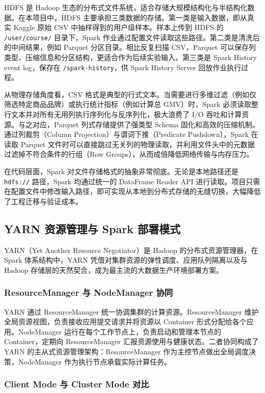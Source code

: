 HDFS 是 Hadoop 生态的分布式文件系统，适合存储大规模结构化与半结构化数据。在本项目中，HDFS 主要承担三类数据的存储。第一类是输入数据，即从真实 Kaggle 原始 CSV 中抽样得到的用户级样本。样本上传到 HDFS 的 \texttt{/user/course/} 目录下，Spark 作业通过配置文件读取这些路径。第二类是清洗后的中间结果，例如 Parquet 分区目录。相比反复扫描 CSV，Parquet 可以保存列类型、压缩信息和分区结构，更适合作为后续实验输入。第三类是 Spark History event log，保存在 \texttt{/spark-history}，供 Spark History Server 回放作业执行过程。

从物理存储角度看，CSV 格式是典型的行式文本。当需要进行多维过滤（例如仅筛选特定商品品牌）或执行统计指标（例如计算总 GMV）时，Spark 必须读取整行文本并对所有无用列执行序列化与反序列化，极大浪费了 I/O 吞吐和计算资源。与之对应，Parquet 列式存储提供了强类型 Schema 固化和高效的压缩机制。通过列裁剪（Column Projection）与谓词下推（Predicate Pushdown），Spark 在读取 Parquet 文件时可以直接跳过无关列的物理读取，并利用文件头中的元数据过滤掉不符合条件的行组（Row Groups），从而成倍降低网络传输与内存压力。

在代码层面，Spark 对文件存储格式的抽象非常彻底。无论是本地路径还是 \texttt{hdfs://} 路径，Spark 均通过统一的 DataFrame Reader API 进行读取。项目只需在配置文件中修改输入路径，即可实现从本地到分布式存储的无缝切换，大幅降低了工程迁移与验证成本。

\subsection{YARN 资源管理与 Spark 部署模式}

YARN（Yet Another Resource Negotiator）是 Hadoop 的分布式资源管理器，在 Spark 体系结构中，YARN 凭借对集群资源的弹性调度、应用队列隔离以及与 Hadoop 存储层的天然契合，成为最主流的大数据生产环境部署方案。

\subsubsection{ResourceManager 与 NodeManager 协同}

YARN 通过 ResourceManager 统一协调集群的计算资源。ResourceManager 维护全局资源视图，负责接收应用提交请求并将资源以 Container 形式分配给各个应用。NodeManager 运行在每个工作节点上，负责启动和管理本节点的 Container，定期向 ResourceManager 汇报资源使用与健康状态。二者协同构成了 YARN 的主从式资源管理架构：ResourceManager 作为主控节点做出全局调度决策，NodeManager 作为执行节点承载实际计算任务。

\subsubsection{Client Mode 与 Cluster Mode 对比}

